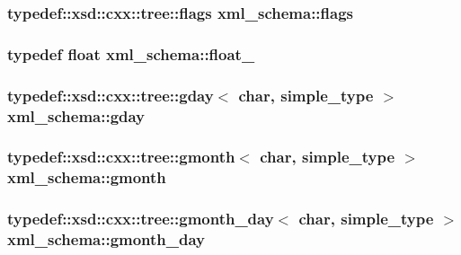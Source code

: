 \subsubsection[{\texorpdfstring{flags}{flags}}]{\setlength{\rightskip}{0pt plus 5cm}typedef\+::xsd\+::cxx\+::tree\+::flags {\bf xml\+\_\+schema\+::flags}}\hypertarget{namespacexml__schema_a0612287d030cb2732d31a45b258fdc87}{}\label{namespacexml__schema_a0612287d030cb2732d31a45b258fdc87}
\subsubsection[{\texorpdfstring{float\+\_\+}{float_}}]{\setlength{\rightskip}{0pt plus 5cm}typedef float {\bf xml\+\_\+schema\+::float\+\_\+}}\hypertarget{namespacexml__schema_ad7e04ab17bba0b3fdde43fb79ef6ed87}{}\label{namespacexml__schema_ad7e04ab17bba0b3fdde43fb79ef6ed87}
\subsubsection[{\texorpdfstring{gday}{gday}}]{\setlength{\rightskip}{0pt plus 5cm}typedef\+::xsd\+::cxx\+::tree\+::gday$<$ char, {\bf simple\+\_\+type} $>$ {\bf xml\+\_\+schema\+::gday}}\hypertarget{namespacexml__schema_a80cbdd05209953df8c443ba8d81d4c25}{}\label{namespacexml__schema_a80cbdd05209953df8c443ba8d81d4c25}
\subsubsection[{\texorpdfstring{gmonth}{gmonth}}]{\setlength{\rightskip}{0pt plus 5cm}typedef\+::xsd\+::cxx\+::tree\+::gmonth$<$ char, {\bf simple\+\_\+type} $>$ {\bf xml\+\_\+schema\+::gmonth}}\hypertarget{namespacexml__schema_afe97b9ae1d131c601ce16f8bb4cdc022}{}\label{namespacexml__schema_afe97b9ae1d131c601ce16f8bb4cdc022}
\subsubsection[{\texorpdfstring{gmonth\+\_\+day}{gmonth_day}}]{\setlength{\rightskip}{0pt plus 5cm}typedef\+::xsd\+::cxx\+::tree\+::gmonth\+\_\+day$<$ char, {\bf simple\+\_\+type} $>$ {\bf xml\+\_\+schema\+::gmonth\+\_\+day}}\hypertarget{namespacexml__schema_a61e87eff200c80a4fce76244d6d01296}{}\label{namespacexml__schema_a61e87eff200c80a4fce76244d6d01296}
